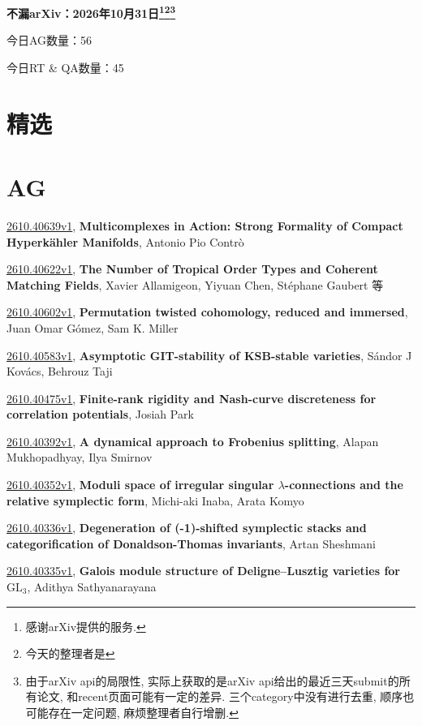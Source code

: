 \documentclass[9pt, a4paper]{article}
\theoremstyle{plain}
\theoremstyle{definition}
\theoremstyle{remark}
\newcommand{\arxiv}[3]{\href{https://arxiv.org/abs/#1}{#1}, \textbf{\textcolor{arxivblue}{#2}}, #3}
\newcommand{\AGnumber}{56}
\newcommand{\RTQAnumber}{45}
\newcommand{\NewestDate}{2026年10月31日}
\newcommand{\todayarXiver}{} %
\begin{document}
\begin{center}
    \Huge\textbf{不漏arXiv：\NewestDate\footnote{感谢arXiv提供的服务.}\footnote{今天的整理者是\todayarXiver}\footnote{由于arXiv api的局限性, 实际上获取的是arXiv api给出的最近三天submit的所有论文, 和recent页面可能有一定的差异. 三个category中没有进行去重, 顺序也可能存在一定问题, 麻烦整理者自行增删.}} \\
\end{center}

\setcounter{section}{-1}

\begin{center}
    今日AG数量：\AGnumber
    
    今日RT \& QA数量：\RTQAnumber
    
\end{center}


\section{精选}


\section{AG}
\arxiv{2610.40639v1}{Multicomplexes in Action: Strong Formality of Compact Hyperkähler Manifolds}{Antonio Pio Contrò}

\arxiv{2610.40622v1}{The Number of Tropical Order Types and Coherent Matching Fields}{Xavier Allamigeon, Yiyuan Chen, Stéphane Gaubert 等}

\arxiv{2610.40602v1}{Permutation twisted cohomology, reduced and immersed}{Juan Omar Gómez, Sam K. Miller}

\arxiv{2610.40583v1}{Asymptotic GIT-stability of KSB-stable varieties}{Sándor J Kovács, Behrouz Taji}

\arxiv{2610.40475v1}{Finite-rank rigidity and Nash-curve discreteness for correlation potentials}{Josiah Park}

\arxiv{2610.40392v1}{A dynamical approach to Frobenius splitting}{Alapan Mukhopadhyay, Ilya Smirnov}

\arxiv{2610.40352v1}{Moduli space of irregular singular $λ$-connections and the relative symplectic form}{Michi-aki Inaba, Arata Komyo}

\arxiv{2610.40336v1}{Degeneration of (-1)-shifted symplectic stacks and categorification of Donaldson-Thomas invariants}{Artan Sheshmani}

\arxiv{2610.40335v1}{Galois module structure of Deligne--Lusztig varieties for $\mathrm{GL}_3$}{Adithya Sathyanarayana}
\end{document}
